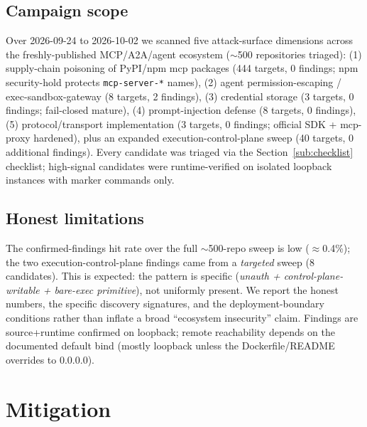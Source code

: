 \documentclass{llncs}
\begin{document}
\subsection{Campaign scope}\label{sub:scope}
Over 2026-09-24 to 2026-10-02 we scanned five attack-surface dimensions across the freshly-published MCP/A2A/agent ecosystem ($\sim$500 repositories triaged): (1) supply-chain poisoning of PyPI/npm mcp packages (444 targets, 0 findings; npm security-hold protects \texttt{mcp-server-*} names), (2) agent permission-escaping / exec-sandbox-gateway (8 targets, 2 findings), (3) credential storage (3 targets, 0 findings; fail-closed mature), (4) prompt-injection defense (8 targets, 0 findings), (5) protocol/transport implementation (3 targets, 0 findings; official SDK + mcp-proxy hardened), plus an expanded execution-control-plane sweep (40 targets, 0 additional findings). Every candidate was triaged via the Section~\ref{sub:checklist} checklist; high-signal candidates were runtime-verified on isolated loopback instances with marker commands only.

\subsection{Honest limitations}\label{sub:limits}
The confirmed-findings hit rate over the full $\sim$500-repo sweep is low ($\approx$0.4\%); the two execution-control-plane findings came from a \emph{targeted} sweep (8 candidates). This is expected: the pattern is specific (\emph{unauth + control-plane-writable + bare-exec primitive}), not uniformly present. We report the honest numbers, the specific discovery signatures, and the deployment-boundary conditions rather than inflate a broad ``ecosystem insecurity'' claim. Findings are source+runtime confirmed on loopback; remote reachability depends on the documented default bind (mostly loopback unless the Dockerfile/README overrides to 0.0.0.0).

\section{Mitigation}\label{sec:mitigation}
\end{document}
